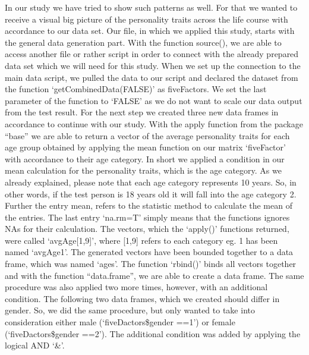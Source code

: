  In our study we have tried to show such patterns as well. For that we wanted to receive a visual big picture of the personality traits across the life course with accordance to our data set. 
Our file, in which we applied this study, starts with the general data generation part. With the function source(), we are able to access another file or rather script in order to connect with the already prepared data set which we will need for this study. 
 \newline \newline
When we set up the connection to the main data script, we pulled the data to our script and declared the dataset from the function `getCombinedData(FALSE)' as fiveFactors. We set the last parameter of the function to `FALSE' as we do not want to scale our data output from the test result.
 \newline \newline 
For the next step we created three new data frames in accordance to continue with our study. With the apply function from the package “base” we are able to return a vector of the average personality traits for each age group obtained by applying the mean function on our matrix `fiveFactor' with accordance to their age category. In short we applied a condition in our mean calculation for the personality traits, which is the age category.
\newline \newline
As we already explained, please note that each age category represents 10 years. So, in other words, if the test person is 18 years old it will fall into the age category 2. Further the entry mean, refers to the statistic method to calculate the mean of the entries. The last entry `na.rm=T' simply means that the functions ignores NAs for their calculation.
\newline \newline
The vectors, which the `apply()' functions returned, were called `avgAge[1,9]', where [1,9] refers to each category eg. 1 has been named `avgAge1'.
The generated vectors have been bounded together to a data frame, which was named `ages'.  The function `rbind()' binds all vectors together and with the function “data.frame”, we are able to create a data frame. 
\newline \newline
The same procedure was also applied two more times, however, with an additional condition. The following two data frames, which we created should differ in gender. So, we did the same procedure, but only wanted to take into consideration either male (`fiveDactors\$gender ==1') or female (`fiveDactors\$gender ==2'). The additional condition was added by applying the logical AND `\&'.  
